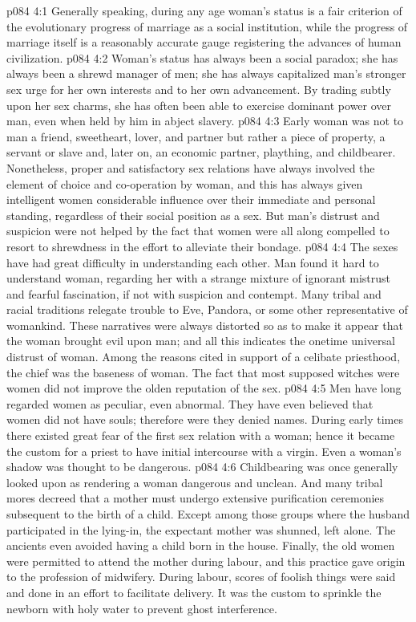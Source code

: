 \vs p084 4:1 Generally speaking, during any age woman’s status is a fair criterion of the evolutionary progress of marriage as a social institution, while the progress of marriage itself is a reasonably accurate gauge registering the advances of human civilization.
\vs p084 4:2 \pc Woman’s status has always been a social paradox; she has always been a shrewd manager of men; she has always capitalized man’s stronger sex urge for her own interests and to her own advancement. By trading subtly upon her sex charms, she has often been able to exercise dominant power over man, even when held by him in abject slavery.
\vs p084 4:3 Early woman was not to man a friend, sweetheart, lover, and partner but rather a piece of property, a servant or slave and, later on, an economic partner, plaything, and childbearer. Nonetheless, proper and satisfactory sex relations have always involved the element of choice and co\hyp{}operation by woman, and this has always given intelligent women considerable influence over their immediate and personal standing, regardless of their social position as a sex. But man’s distrust and suspicion were not helped by the fact that women were all along compelled to resort to shrewdness in the effort to alleviate their bondage.
\vs p084 4:4 \pc The sexes have had great difficulty in understanding each other. Man found it hard to understand woman, regarding her with a strange mixture of ignorant mistrust and fearful fascination, if not with suspicion and contempt. Many tribal and racial traditions relegate trouble to Eve, Pandora, or some other representative of womankind. These narratives were always distorted so as to make it appear that the woman brought evil upon man; and all this indicates the onetime universal distrust of woman. Among the reasons cited in support of a celibate priesthood, the chief was the baseness of woman. The fact that most supposed witches were women did not improve the olden reputation of the sex.
\vs p084 4:5 Men have long regarded women as peculiar, even abnormal. They have even believed that women did not have souls; therefore were they denied names. During early times there existed great fear of the first sex relation with a woman; hence it became the custom for a priest to have initial intercourse with a virgin. Even a woman’s shadow was thought to be dangerous.
\vs p084 4:6 Childbearing was once generally looked upon as rendering a woman dangerous and unclean. And many tribal mores decreed that a mother must undergo extensive purification ceremonies subsequent to the birth of a child. Except among those groups where the husband participated in the lying\hyp{}in, the expectant mother was shunned, left alone. The ancients even avoided having a child born in the house. Finally, the old women were permitted to attend the mother during labour, and this practice gave origin to the profession of midwifery. During labour, scores of foolish things were said and done in an effort to facilitate delivery. It was the custom to sprinkle the newborn with holy water to prevent ghost interference.
